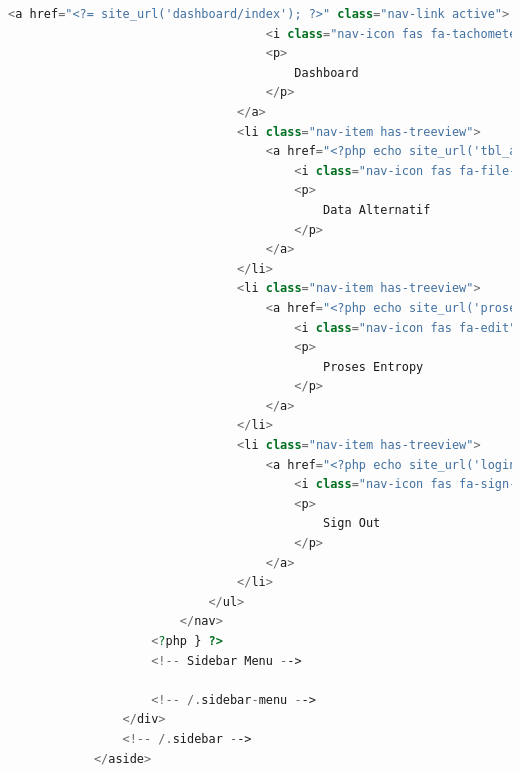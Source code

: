 \begin{lstlisting}[language=PHP]
	                            <a href="<?= site_url('dashboard/index'); ?>" class="nav-link active">  
	                                <i class="nav-icon fas fa-tachometer-alt"></i>  
	                                <p>  
	                                    Dashboard  
	                                </p>  
	                            </a>  
	                            <li class="nav-item has-treeview">  
	                                <a href="<?php echo site_url('tbl_alternatif/index_user'); ?>" class="nav-link">  
	                                    <i class="nav-icon fas fa-file-alt"></i>  
	                                    <p>  
	                                        Data Alternatif  
	                                    </p>  
	                                </a>  
	                            </li>  
	                            <li class="nav-item has-treeview">  
	                                <a href="<?php echo site_url('proses_entropy/proses_user'); ?>" class="nav-link">  
	                                    <i class="nav-icon fas fa-edit"></i>  
	                                    <p>  
	                                        Proses Entropy  
	                                    </p>  
	                                </a>  
	                            </li>  
	                            <li class="nav-item has-treeview">  
	                                <a href="<?php echo site_url('login/logout'); ?>" class="nav-link">  
	                                    <i class="nav-icon fas fa-sign-out-alt"></i>  
	                                    <p>  
	                                        Sign Out  
	                                    </p>  
	                                </a>  
	                            </li>  
	                        </ul>  
	                    </nav>  
	                <?php } ?>  
	                <!-- Sidebar Menu -->  
	  
	                <!-- /.sidebar-menu -->  
	            </div>  
	            <!-- /.sidebar -->  
	        </aside>
\end{lstlisting}


